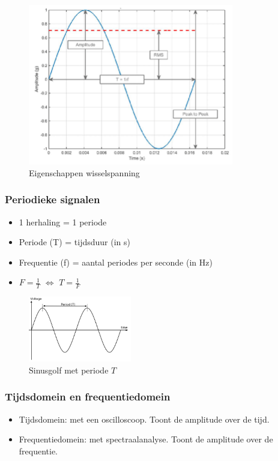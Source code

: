 \documentclass{article}
\begin{document}
\begin{figure}[H]
    \centering
    \includegraphics[width=0.8\textwidth]{Screenshot_20200217_121136.png}
    \caption{Eigenschappen wisselspanning}
\end{figure}

\subsubsection{Periodieke signalen}
\begin{itemize}
    \item 1 herhaling = 1 periode
    \item Periode (T) = tijdsduur (in s)
    \item Frequentie (f) = aantal periodes per seconde (in Hz)
    \item $F = \frac1T$ $\Leftrightarrow$ $T = \frac1F$
\end{itemize}

\begin{figure}[H]
    \centering
    \includegraphics[width=0.4\textwidth]{Screenshot_20200217_122002.png}
    \caption{Sinusgolf met periode $T$}
\end{figure}


\subsubsection{Tijdsdomein en frequentiedomein}
\begin{itemize}
    \item Tijdsdomein: met een oscilloscoop. Toont de amplitude over de tijd.
    \item Frequentiedomein: met spectraalanalyse. Toont de amplitude over de frequentie.
\end{itemize}
\end{document}
